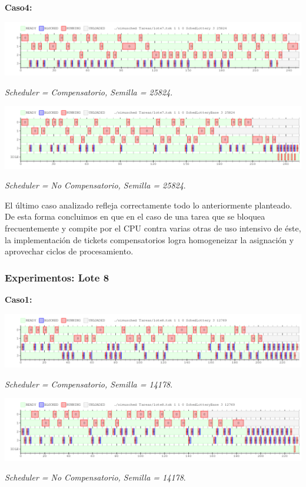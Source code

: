 \vspace{2mm}
\textbf{Caso4:}


\includegraphics[width=1\textwidth]{./Graficos/Ej10v2/Task7/ej9_4.png}
\begin{center}
 \textit{Scheduler = Compensatorio, Semilla = 25824}.
\end{center}


\includegraphics[width=1\textwidth]{./Graficos/Ej10v2/Task7/ej9_4_base.png}
\begin{center}
 \textit{Scheduler = No Compensatorio, Semilla = 25824}.
\end{center}

El \'ultimo caso analizado refleja correctamente todo lo anteriormente planteado. De esta forma concluimos en que en el caso de una tarea que se bloquea frecuentemente y compite por el CPU contra varias otras de uso intensivo de \'este, la implementaci\'on de tickets compensatorios logra homogeneizar la asignaci\'on y aprovechar ciclos de procesamiento.

\subsubsection{Experimentos: Lote 8}

\vspace{2mm}

\textbf{Caso1:}

\includegraphics[width=1\textwidth]{./Graficos/Ej10v2/Task8/ej9_1.png}
\begin{center}
 \textit{Scheduler = Compensatorio, Semilla = 14178}.
\end{center}


\includegraphics[width=1\textwidth]{./Graficos/Ej10v2/Task8/ej9_1_base.png}
\begin{center}
 \textit{Scheduler = No Compensatorio, Semilla = 14178}.
\end{center}